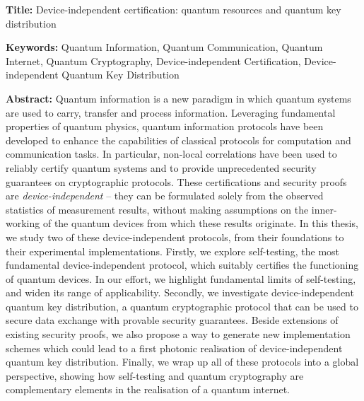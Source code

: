 \documentclass[french,12pt,a4paper]{book}
\begin{document}
\small

\begin{mdframed}[linecolor=Prune,linewidth=1]
	
	\textbf{Title:} Device-independent certification: quantum resources and quantum key distribution
	
	
	\noindent \textbf{Keywords:} Quantum Information, Quantum Communication, Quantum Internet, Quantum Cryptography, Device-independent Certification, Device-independent Quantum Key Distribution 
	
	\vspace{-.5cm}
	\begin{multicols}{2}
		\noindent \textbf{Abstract:} 
		Quantum information is a new paradigm in which quantum systems are used to carry, transfer and process information.
		Leveraging fundamental properties of quantum physics, quantum information protocols have been developed to enhance the capabilities of classical protocols for computation and communication tasks.
		In particular, non-local correlations have been used to reliably certify quantum systems and to provide unprecedented security guarantees on cryptographic protocols.
		These certifications and security proofs are \textit{device-independent} -- they can be formulated solely from the observed statistics of measurement results, without making assumptions on the inner-working of the quantum devices from which these results originate.
		In this thesis, we study two of these device-independent protocols, from their foundations to their experimental implementations. 
		Firstly, we explore self-testing, the most fundamental device-independent protocol, which suitably certifies the functioning of quantum devices.
		In our effort, we highlight fundamental limits of self-testing, and widen its range of applicability.
		Secondly, we investigate device-independent quantum key distribution, a quantum cryptographic protocol that can be used to secure data exchange with provable security guarantees.
		Beside extensions of existing security proofs, we also propose a way to generate new implementation schemes which could lead to a first photonic realisation of device-independent quantum key distribution.
		Finally, we wrap up all of these protocols into a global perspective, showing how self-testing and quantum cryptography are complementary elements in the realisation of a quantum internet.
	\end{multicols}
\end{mdframed}

\vspace{2mm}
\end{document}
